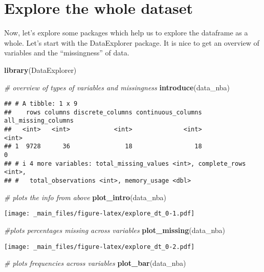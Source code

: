 \documentclass[
]{book}
\newenvironment{Shaded}{\begin{snugshade}}{\end{snugshade}}
\newcommand{\CommentTok}[1]{\textcolor[rgb]{0.56,0.35,0.01}{\textit{#1}}}
\newcommand{\FunctionTok}[1]{\textcolor[rgb]{0.13,0.29,0.53}{\textbf{#1}}}
\newcommand{\NormalTok}[1]{#1}
\begin{document}
\hypertarget{explore-the-whole-dataset}{%
\section{Explore the whole dataset}\label{explore-the-whole-dataset}}

Now, let's explore some packages which help us to explore the dataframe as a whole.
Let's start with the DataExplorer package. It is nice to get an overview of variables and the ``missingness'' of data.

\begin{Shaded}
\begin{Highlighting}[]
\FunctionTok{library}\NormalTok{(DataExplorer)}

\CommentTok{\# overview of types of variables and missingness}
\FunctionTok{introduce}\NormalTok{(data\_nba)}
\end{Highlighting}
\end{Shaded}

\begin{verbatim}
## # A tibble: 1 x 9
##    rows columns discrete_columns continuous_columns all_missing_columns
##   <int>   <int>            <int>              <int>               <int>
## 1  9728      36               18                 18                   0
## # i 4 more variables: total_missing_values <int>, complete_rows <int>,
## #   total_observations <int>, memory_usage <dbl>
\end{verbatim}

\begin{Shaded}
\begin{Highlighting}[]
\CommentTok{\# plots the info from above}
\FunctionTok{plot\_intro}\NormalTok{(data\_nba)}
\end{Highlighting}
\end{Shaded}

\texttt{[image: \_main\_files/figure-latex/explore\_dt\_0-1.pdf]}

\begin{Shaded}
\begin{Highlighting}[]
\CommentTok{\#plots percentages missing across variables}
\FunctionTok{plot\_missing}\NormalTok{(data\_nba)}
\end{Highlighting}
\end{Shaded}

\texttt{[image: \_main\_files/figure-latex/explore\_dt\_0-2.pdf]}

\begin{Shaded}
\begin{Highlighting}[]
\CommentTok{\# plots frequencies across variables}
\FunctionTok{plot\_bar}\NormalTok{(data\_nba)}
\end{Highlighting}
\end{Shaded}
\end{document}
